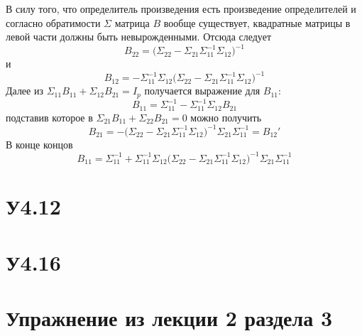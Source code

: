 \documentclass[a4paper]{article}
\begin{document}
В силу того, что определитель произведения есть произведение определителей
и согласно обратимости $\Sigma$ матрица $B$ вообще существует, квадратные
матрицы в левой части должны быть невырожденными. Отсюда следует
\[
B_{22} = \bigl( \Sigma_{22} - \Sigma_{21}\Sigma_{11}^{-1} \Sigma_{12} \bigr)^{-1}
\]
и
\[
B_{12} = -\Sigma_{11}^{-1} \Sigma_{12} \bigl( \Sigma_{22} - \Sigma_{21}\Sigma_{11}^{-1} \Sigma_{12} \bigr)^{-1}
\]
Далее из $\Sigma_{11}B_{11} + \Sigma_{12}B_{21} = I_p$ получается выражение для $B_{11}$:
\[ B_{11} = \Sigma_{11}^{-1} - \Sigma_{11}^{-1}\Sigma_{12}B_{21}\]
подставив которое в $\Sigma_{21}B_{11} + \Sigma_{22}B_{21}=0$ можно получить
\[ 
B_{21}
= - \bigl(\Sigma_{22} - \Sigma_{21}\Sigma_{11}^{-1}\Sigma_{12} \bigr)^{-1} \Sigma_{21}\Sigma_{11}^{-1}
= B_{12}'
\]
В конце концов
\[
B_{11}
= \Sigma_{11}^{-1} + \Sigma_{11}^{-1}\Sigma_{12}
		\bigl(\Sigma_{22} - \Sigma_{21}\Sigma_{11}^{-1}\Sigma_{12} \bigr)^{-1}
	\Sigma_{21}\Sigma_{11}^{-1}
\]


\section{У4.12} %
\label{sec:problem_4_12}


\section{У4.16} %
\label{sec:problem_4_16}


\section{Упражнение из лекции 2 раздела 3} %
\label{sec:problem_l2_s3}
\end{document}
